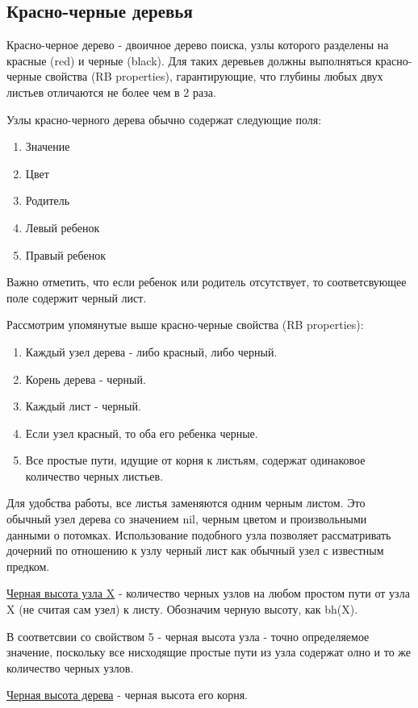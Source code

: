 \subsection{Красно-черные деревья}
Красно-черное дерево - двоичное дерево поиска, узлы которого 
разделены на красные (red) и черные (black). Для таких деревьев
должны выполняться красно-черные свойства (RB properties), 
гарантирующие, что глубины любых двух листьев отличаются не более
чем в 2 раза.

Узлы красно-черного дерева обычно содержат следующие поля:
\begin{enumerate}
	\item Значение
	\item Цвет
	\item Родитель
	\item Левый ребенок
	\item Правый ребенок
\end{enumerate}	

Важно отметить, что если ребенок или родитель отсутствует, то
соответсвующее поле содержит черный лист.

Рассмотрим упомянутые выше красно-черные свойства (RB properties):
\begin{enumerate}
	\item Каждый узел дерева - либо красный, либо черный.
	\item Корень дерева - черный.
	\item Каждый лист - черный.
	\item Если узел красный, то оба его ребенка черные.
	\item Все простые пути, идущие от корня к листьям, содержат 
		  одинаковое количество черных листьев.
\end{enumerate}

Для удобства работы, все листья заменяются одним черным листом.
Это обычный узел дерева со значением nil, черным цветом и произвольными данными
о потомках. Использование подобного узла позволяет рассматривать дочерний 
по отношению к узлу черный лист как обычный узел с известным предком.

\underline{Черная высота узла X} - количество черных узлов на любом простом 
пути от узла X (не считая сам узел) к листу. Обозначим черную высоту,
как bh(X).

В соответсвии со свойством 5 - черная высота узла - точно определяемое значение,
поскольку все нисходящие простые пути из узла содержат олно и то же 
количество черных узлов.

\underline{Черная высота дерева} - черная высота его корня.

